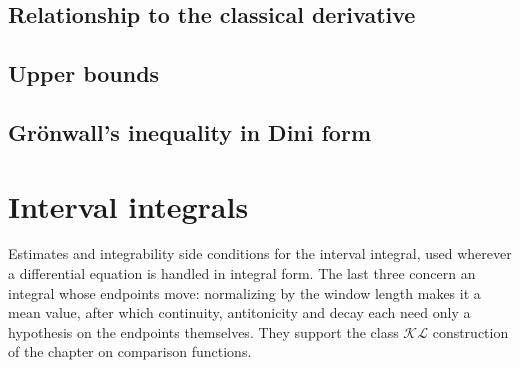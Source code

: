 
\subsection{Relationship to the classical derivative}




\subsection{Upper bounds}




\subsection{Gr\"onwall's inequality in Dini form}



\section{Interval integrals}

Estimates and integrability side conditions for the interval integral, used wherever a
differential equation is handled in integral form. The last three concern an integral whose
endpoints move: normalizing by the window length makes it a mean value, after which continuity,
antitonicity and decay each need only a hypothesis on the endpoints themselves. They support the
class $\mathcal{KL}$ construction of the chapter on comparison functions.




